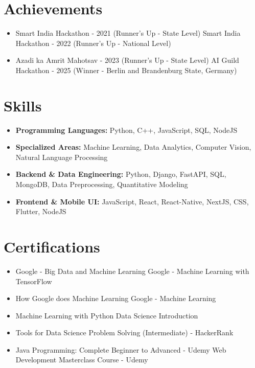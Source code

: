 \documentclass[a4paper,10pt]{article}
\begin{document}
\section*{Achievements}
\begin{itemize}
\item Smart India Hackathon - 2021 (Runner's Up - State Level) \hfill Smart India Hackathon - 2022 (Runner's Up - National Level)
\item Azadi ka Amrit Mahotsav - 2023 (Runner's Up - State Level) \hfill AI Guild Hackathon - 2025 (Winner - Berlin and Brandenburg State, Germany)
\end{itemize}

\section*{Skills}
\begin{itemize}
  \item \textbf{Programming Languages:} Python, C++, JavaScript, SQL, NodeJS
  \item \textbf{Specialized Areas:} Machine Learning, Data Analytics, Computer Vision, Natural Language Processing
  \item \textbf{Backend \& Data Engineering:} Python, Django, FastAPI, SQL, MongoDB, Data Preprocessing, Quantitative Modeling
  \item \textbf{Frontend \& Mobile UI:} JavaScript, React, React-Native, NextJS, CSS, Flutter, NodeJS
\end{itemize}

\section*{Certifications}
\begin{itemize}
\item Google - Big Data and Machine Learning \hfill Google - Machine Learning with TensorFlow
\item How Google does Machine Learning \hfill Google - Machine Learning
\item Machine Learning with Python \hfill Data Science Introduction
\item Tools for Data Science \hfill Problem Solving (Intermediate) - HackerRank
\item Java Programming: Complete Beginner to Advanced - Udemy \hfill Web Development Masterclass Course - Udemy
\end{itemize}
\end{document}
